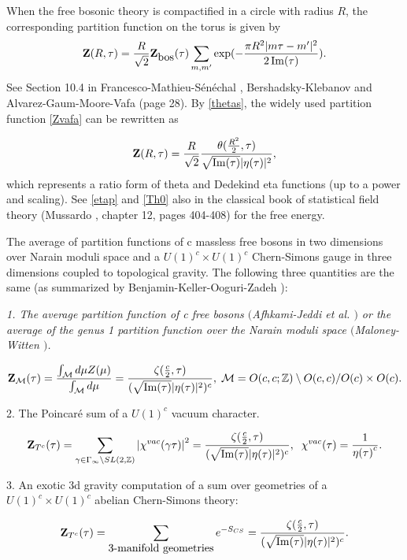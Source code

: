 \documentclass[reqno,english]{amsart}
\newtheorem{open problem}{Open Problem}[section]
\newtheorem{open question}{Open Question}[section]
\newtheorem{open questions on hexagonal lattice}{Open Questions on hexagonal lattice}[section]
\renewcommand{\Im}{\operatorname{Im}}
\begin{document}
When the free bosonic theory is compactified in a circle with radius $R$, the corresponding partition function on the torus is given by
\begin{equation}\aligned\label{Zvafa}
\mathbf{Z}(R,\tau)=\frac{R}{\sqrt2}\mathbf{Z}_{\hbox{bos}}(\tau)\sum_{m,m'}\exp(-\frac{\pi R^2|m\tau-m'|^2}{2\Im(\tau)}).
\endaligned\end{equation}
See Section 10.4 in Francesco-Mathieu-S\'en\'echal \cite{Fran1997},
 Bershadsky-Klebanov \cite{Bers1991} and Alvarez-Gaum-Moore-Vafa \cite{Vafa1986} (page 28). By \eqref{thetas}, the widely used partition function \eqref{Zvafa} can be rewritten as

\begin{equation}\aligned\label{Th0}
\mathbf{Z}(R,\tau)=\frac{R}{\sqrt2}\frac{\theta(\frac{R^2}{2},\tau)}{\sqrt{\Im(\tau)}|\eta(\tau)|^2},
\endaligned\end{equation}
which represents a ratio form of theta and Dedekind eta functions (up to a power and scaling).
See \eqref{etap} and \eqref{Th0} also in the classical book of statistical field theory (Mussardo \cite{Muss2020}, chapter 12, pages 404-408)
for the free energy.


The average of partition functions of c massless free bosons in two dimensions over Narain moduli space and
a $U(1)^c\times U(1)^c$ Chern-Simons gauge in three dimensions coupled to topological gravity.
The following three quantities are the same (as summarized by Benjamin-Keller-Ooguri-Zadeh \cite{Ben2022}):

{\it
1. The average partition function of c free bosons $($Afhkami-Jeddi et al. \cite{Afhk2021}$)$ or the average of the genus 1 partition function over the Narain moduli space $($Maloney-Witten \cite{Witten2020}$)$.

\begin{equation}\aligned\label{M1}
\mathbf{Z}_{\mathcal{M}}(\tau)=\frac{\int_{\mathcal{M}}d\mu Z(\mu)}{\int_{\mathcal{M}}d\mu}=\frac{\zeta(\frac{c}{2},\tau)}{(\sqrt{\Im(\tau)}|\eta(\tau)|^2)^c}
,\;\mathcal{M}=O(c,c;\mathbb{Z})\setminus O(c,c)/ O(c)\times O(c).
\endaligned\end{equation}

2. The Poincar\'e sum of a $U(1)^c$ vacuum character.

\begin{equation}\aligned\label{M2}
\mathbf{Z}_{T^c}(\tau)=\sum_{\gamma\in\Gamma_{\infty}\setminus SL(2,\mathbb{Z})}\left| \chi^{vac}(\gamma\tau)\right|^2
=\frac{\zeta(\frac{c}{2},\tau)}{(\sqrt{\Im(\tau)}|\eta(\tau)|^2)^c},\;\; \chi^{vac}(\tau)=\frac{1}{{\eta(\tau)}^c}.
\endaligned\end{equation}

3. An exotic 3d gravity computation of a sum over geometries of a $U(1)^c\times U(1)^c$ abelian Chern-Simons theory:


\begin{equation}\aligned\label{M3}
\mathbf{Z}_{T^c}(\tau)=\sum_{\hbox{3-manifold geometries}} e^{-S_{CS}}
=\frac{\zeta(\frac{c}{2},\tau)}{(\sqrt{\Im(\tau)}|\eta(\tau)|^2)^c}.
\endaligned\end{equation}
}
\end{document}
